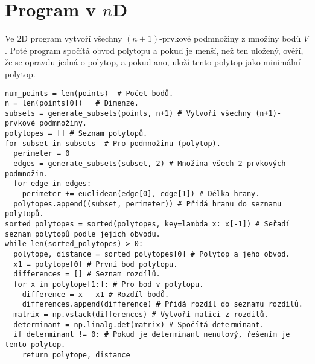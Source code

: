 \section{Program v \texorpdfstring{$n$D}{nD}}
\label{sec:program_nD}

Ve $2$D program vytvoří všechny $(n+1)$-prvkové podmnožiny z množiny bodů $V$. Poté program spočítá obvod polytopu a pokud je menší, než ten uložený, ověří, že se opravdu jedná o polytop, a pokud ano, uloží tento polytop jako minimální polytop.

\begin{mdframed}[style=MyFrame]
\begin{lstlisting}[style=metoo]
num_points = len(points)  # Počet bodů.
n = len(points[0])   # Dimenze.
subsets = generate_subsets(points, n+1) # Vytvoří všechny (n+1)-prvkové podmnožiny.
polytopes = [] # Seznam polytopů.
for subset in subsets  # Pro podmnožinu (polytop).
  perimeter = 0
  edges = generate_subsets(subset, 2) # Množina všech 2-prvkových podmnožin.
  for edge in edges:
    perimeter += euclidean(edge[0], edge[1]) # Délka hrany.
  polytopes.append((subset, perimeter)) # Přidá hranu do seznamu polytopů.
sorted_polytopes = sorted(polytopes, key=lambda x: x[-1]) # Seřadí seznam polytopů podle jejich obvodu.
while len(sorted_polytopes) > 0:
  polytope, distance = sorted_polytopes[0] # Polytop a jeho obvod.
  x1 = polytope[0] # První bod polytopu.
  differences = [] # Seznam rozdílů.
  for x in polytope[1:]: # Pro bod v polytopu.
    difference = x - x1 # Rozdíl bodů.
    differences.append(difference) # Přidá rozdíl do seznamu rozdílů.
  matrix = np.vstack(differences) # Vytvoří matici z rozdílů.
  determinant = np.linalg.det(matrix) # Spočítá determinant.
  if determinant != 0: # Pokud je determinant nenulový, řešením je tento polytop.
    return polytope, distance
\end{lstlisting}
\end{mdframed}